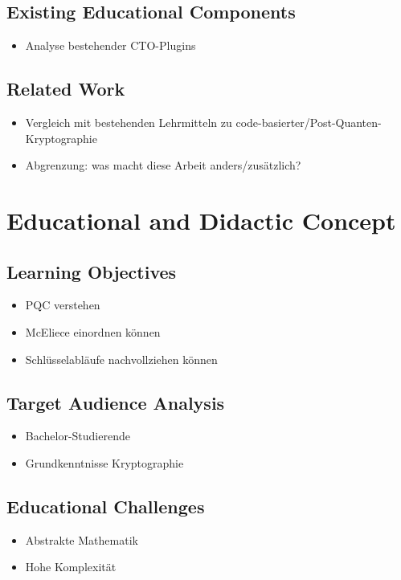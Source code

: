 \documentclass[a4paper,11pt]{article}
\begin{document}
\subsection{Existing Educational Components}
\begin{itemize}
	\item Analyse bestehender CTO-Plugins
\end{itemize}

\subsection{Related Work}
\begin{itemize}
	\item Vergleich mit bestehenden Lehrmitteln zu code-basierter/Post-Quanten-Kryptographie
	\item Abgrenzung: was macht diese Arbeit anders/zusätzlich?
\end{itemize}

\section{Educational and Didactic Concept}

\subsection{Learning Objectives}
\begin{itemize}
	\item PQC verstehen
	\item McEliece einordnen können
	\item Schlüsselabläufe nachvollziehen können
\end{itemize}

\subsection{Target Audience Analysis}
\begin{itemize}
	\item Bachelor-Studierende
	\item Grundkenntnisse Kryptographie
\end{itemize}

\subsection{Educational Challenges}
\begin{itemize}
	\item Abstrakte Mathematik
	\item Hohe Komplexität
\end{itemize}
\end{document}
